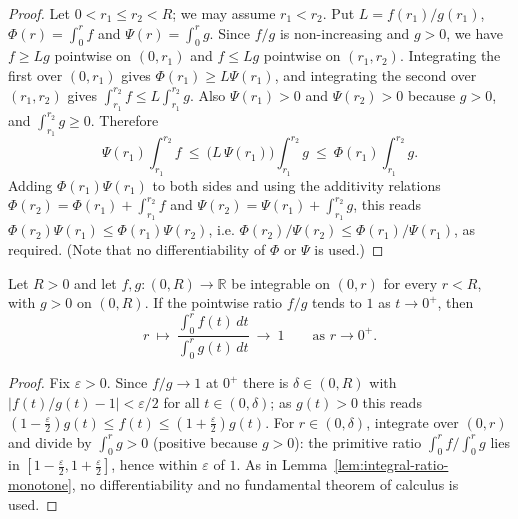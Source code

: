 \begin{proof}
\leanok
Let $0<r_1\le r_2<R$; we may assume $r_1<r_2$. Put $L=f(r_1)/g(r_1)$,
$\Phi(r)=\int_0^rf$ and $\Psi(r)=\int_0^rg$. Since $f/g$ is non-increasing and
$g>0$, we have $f\ge Lg$ pointwise on $(0,r_1)$ and $f\le Lg$ pointwise on
$(r_1,r_2)$. Integrating the first over $(0,r_1)$ gives $\Phi(r_1)\ge L\Psi(r_1)$,
and integrating the second over $(r_1,r_2)$ gives
$\int_{r_1}^{r_2}f\le L\int_{r_1}^{r_2}g$. Also $\Psi(r_1)>0$ and
$\Psi(r_2)>0$ because $g>0$, and $\int_{r_1}^{r_2}g\ge0$. Therefore
$$\Psi(r_1)\int_{r_1}^{r_2}f\ \le\ \bigl(L\,\Psi(r_1)\bigr)\int_{r_1}^{r_2}g
\ \le\ \Phi(r_1)\int_{r_1}^{r_2}g .$$
Adding $\Phi(r_1)\Psi(r_1)$ to both sides and using the additivity relations
$\Phi(r_2)=\Phi(r_1)+\int_{r_1}^{r_2}f$ and
$\Psi(r_2)=\Psi(r_1)+\int_{r_1}^{r_2}g$, this reads
$\Phi(r_2)\Psi(r_1)\le\Phi(r_1)\Psi(r_2)$, i.e.
$\Phi(r_2)/\Psi(r_2)\le\Phi(r_1)/\Psi(r_1)$, as required. (Note that no
differentiability of $\Phi$ or $\Psi$ is used.)
\end{proof}

\begin{lemma}
\label{lem:integral-ratio-normalized}
\leanok
Let $R>0$ and let $f,g\colon(0,R)\to\mathbb R$ be integrable on $(0,r)$ for
every $r<R$, with $g>0$ on $(0,R)$. If the pointwise ratio $f/g$ tends to $1$
as $t\to0^+$, then
$$r\ \longmapsto\ \frac{\int_0^rf(t)\,dt}{\int_0^rg(t)\,dt}\ \longrightarrow\ 1
\qquad\text{as }r\to0^+.$$
\end{lemma}

\begin{proof}
\leanok
Fix $\varepsilon>0$. Since $f/g\to1$ at $0^+$ there is $\delta\in(0,R)$ with
$|f(t)/g(t)-1|<\varepsilon/2$ for all $t\in(0,\delta)$; as $g(t)>0$ this reads
$(1-\tfrac\varepsilon2)g(t)\le f(t)\le(1+\tfrac\varepsilon2)g(t)$. For
$r\in(0,\delta)$, integrate over $(0,r)$ and divide by $\int_0^rg>0$ (positive
because $g>0$): the primitive ratio $\int_0^rf/\int_0^rg$ lies in
$[1-\tfrac\varepsilon2,1+\tfrac\varepsilon2]$, hence within $\varepsilon$ of $1$.
As in Lemma~\ref{lem:integral-ratio-monotone}, no differentiability and no
fundamental theorem of calculus is used.
\end{proof}

